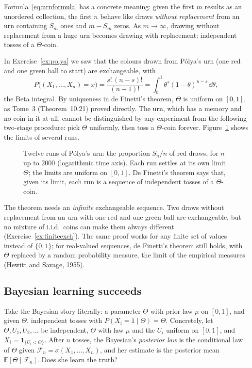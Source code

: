 Formula~\eqref{eq:urnformula} has a concrete meaning: given the first $m$ results as an unordered collection, the first $n$ behave like draws \emph{without replacement} from an urn containing $S_m$ ones and
$m-S_m$ zeros. As $m\to\infty$, drawing without replacement from a huge urn becomes drawing with replacement: independent tosses of a $\Theta$-coin.

\begin{example}\label{ex:polyadf}
In Exercise~\ref{ex:polya} we saw that the colours drawn from P\'olya's urn (one red and one green ball to start) are exchangeable, with
\[
P\bigl((X_1,\dots,X_n)=x\bigr)=\frac{s!\,(n-s)!}{(n+1)!}=\int_0^1\theta^s(1-\theta)^{n-s}\,\dd\theta,
\]
the Beta integral. By uniqueness in de Finetti's theorem, $\Theta$ is uniform on $[0,1]$, as Tome~3 (Theorem~10.21) proved directly. The urn, which has a memory and no coin in it at all, cannot be
distinguished by any experiment from the following two-stage procedure: pick $\Theta$ uniformly, then toss a $\Theta$-coin forever. Figure~\ref{fig:polyadf} shows the limits of several runs.
\end{example}

\begin{figure}[ht]
\centering{}
\caption{Twelve runs of P\'olya's urn: the proportion $S_n/n$ of red draws, for $n$ up to $2000$ (logarithmic time axis). Each run settles at its own limit $\Theta$; the limits are uniform on $[0,1]$. De Finetti's
theorem says that, given its limit, each run is a sequence of independent tosses of a $\Theta$-coin.}
\label{fig:polyadf}
\end{figure}

The theorem needs an \emph{infinite} exchangeable sequence. Two draws without replacement from an urn with one red and one green ball are exchangeable, but no mixture of i.i.d.\ coins can make
them always different (Exercise~\ref{ex:finiteexch}). The same proof works for any finite set of values instead of $\{0,1\}$; for real-valued sequences, de Finetti's theorem still holds, with $\Theta$ replaced by a random probability measure, the
limit of the empirical measures (Hewitt and Savage, 1955).

\subsection*{Bayesian learning succeeds}

Take the Bayesian story literally: a parameter $\Theta$ with prior law $\mu$ on $[0,1]$, and given $\Theta$, independent tosses with $P(X_i=1\mid\Theta)=\Theta$. Concretely, let $\Theta,U_1,U_2,\dots$ be independent,
$\Theta$ with law $\mu$ and the $U_i$ uniform on $[0,1]$, and $X_i=\mathbf 1_{\{U_i<\Theta\}}$. After $n$ tosses, the Bayesian's \emph{posterior law} is the conditional law of $\Theta$ given $\mathcal F_n=\sigma(X_1,\dots,X_n)$,
and her estimate is the posterior mean $\mathbb E[\Theta\mid\mathcal F_n]$. Does she learn the truth?

